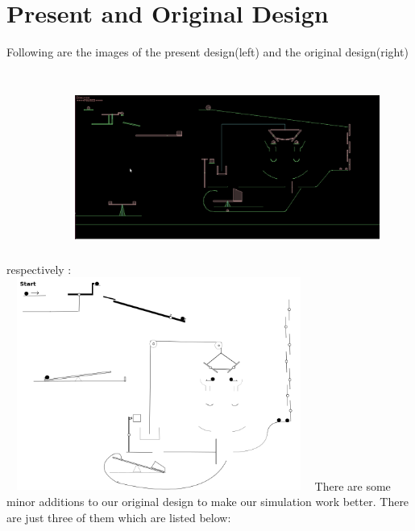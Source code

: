 \documentclass[english]{article}
\begin{document}
\section{Present and Original Design}
Following are the images of the present design(left) and the original design(right) respectively :
\newline
\newline
\includegraphics[width=10cm, height=7cm]{doc/present_design.png}
\includegraphics[width=10cm, height=7cm]{doc/rubeGoldberg.png}
\newline
There are some minor additions to our original design to make our simulation work better. There are just three of them which are listed below:
\end{document}
